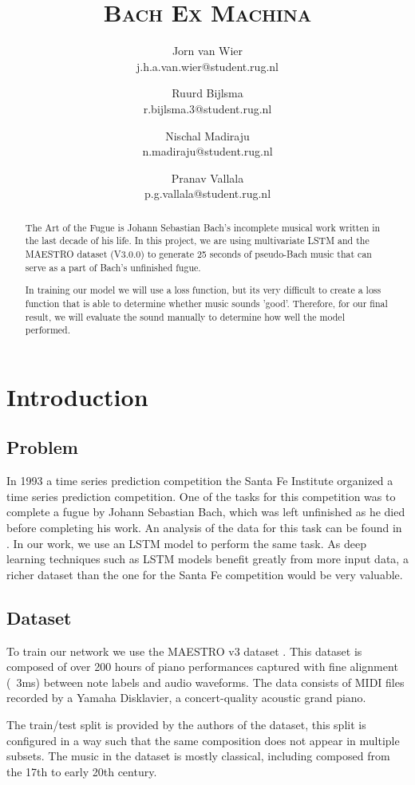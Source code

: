 \documentclass[11pt, twocolumn]{article}
\title{\vspace{1.5cm}\textbf{\scshape{Bach Ex Machina}}}
\author{
    Jorn van Wier\\
    \small j.h.a.van.wier@student.rug.nl
    
    \and 
    
    Ruurd Bijlsma\\
    \small r.bijlsma.3@student.rug.nl
    
    \and 
    
    Nischal Madiraju\\
    \small n.madiraju@student.rug.nl
    
    \and 
    
    Pranav Vallala\\
    \small p.g.vallala@student.rug.nl
}
\date{}
\begin{document}

\maketitle

\thispagestyle{firstpage}

\begin{abstract}
\noindent
The Art of the Fugue is Johann Sebastian Bach's incomplete musical work written in the last decade of his life. In this project, we are using multivariate LSTM and the MAESTRO dataset (V3.0.0) to generate 25 seconds of pseudo-Bach music that can serve as a part of Bach's unfinished fugue. 

In training our model we will use a loss function, but its very difficult to create a loss function that is able to determine whether music sounds 'good'. Therefore, for our final result, we will evaluate the sound manually to determine how well the model performed.

\end{abstract}
\section{Introduction}

\subsection{Problem}
In 1993 a time series prediction competition the Santa Fe Institute organized a time series prediction competition. One of the tasks for this competition was to complete a fugue by Johann Sebastian Bach, which was left unfinished as he died before completing his work. 
An analysis of the data for this task can be found in \cite{dirstt1993baroque}. In our work, we use an LSTM model to perform the same task. As deep learning techniques such as LSTM models benefit greatly from more input data, a richer dataset than the one for the Santa Fe competition would be very valuable.

\subsection{Dataset}
To train our network we use the MAESTRO v3 dataset \cite{hawthorne2018enabling}. This dataset is composed of over 200 hours of piano performances captured with fine alignment (~3ms) between note labels and audio waveforms. The data consists of MIDI files recorded by a Yamaha Disklavier, a concert-quality acoustic grand piano. 
\par
The train/test split is provided by the authors of the dataset, this split is configured in a way such that the same composition does not appear in multiple subsets. The music in the dataset is mostly classical, including composed from the 17th to early 20th century.
\end{document}
